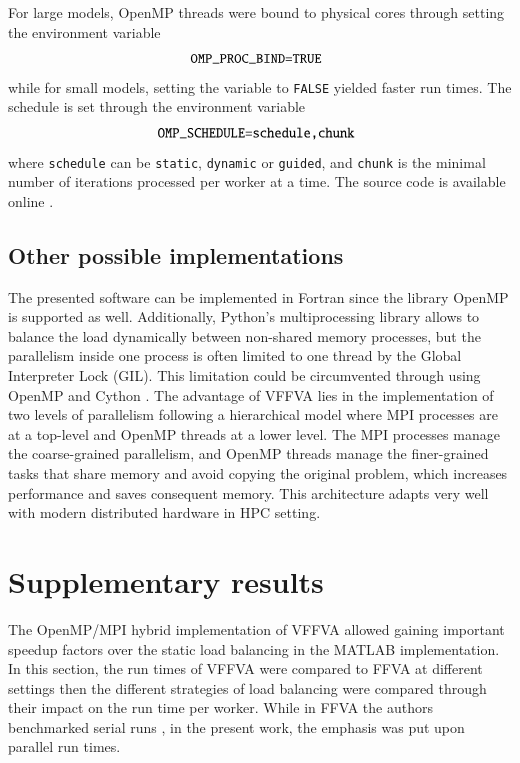 \documentclass[8pt,a4paper]{book}
\begin{document}
For large models, OpenMP threads were bound to physical cores through setting the environment variable 
\begin{equation*} \label{eq:one}
\begin{array}{ll@{}ll}
\texttt{OMP\_PROC\_BIND=TRUE} &\\
\end{array}
\end{equation*}
while for small models, setting the variable to \texttt{FALSE}  yielded faster run times.
The schedule is set through the environment variable
\begin{equation*} \label{eq:one}
\begin{array}{ll@{}ll}
\texttt{OMP\_SCHEDULE=schedule,chunk} &\\
\end{array}
\end{equation*}
where \texttt{schedule} can be \texttt{static}, \texttt{dynamic} or \texttt{guided}, and \texttt{chunk} is the minimal number of iterations processed per worker at a time. The source code is available online \cite{marouen_2018_1442456}.
\subsection*{Other possible implementations}
The presented software can be implemented in Fortran since the library OpenMP is supported as well.
Additionally, Python's multiprocessing library allows to balance the load dynamically between non-shared memory processes, but the parallelism inside one process is often limited to one thread by the Global Interpreter Lock (GIL). This limitation could be circumvented through using OpenMP and Cython \cite{behnel2011cython}. The advantage of VFFVA lies in the implementation of two levels of parallelism following a hierarchical model where MPI processes are at a top-level and OpenMP threads at a lower level. The MPI processes manage the coarse-grained parallelism, and OpenMP threads manage the finer-grained tasks that share memory and avoid copying the original problem, which increases performance and saves consequent memory. This architecture adapts very well with modern distributed hardware in HPC setting.\\
\section*{Supplementary results}
The OpenMP/MPI hybrid implementation of VFFVA allowed gaining important speedup factors over the static load balancing in the MATLAB implementation. In this section, the run times of VFFVA were compared to FFVA at different settings then the different strategies of load balancing were compared through their impact on the run time per worker. While in FFVA the authors benchmarked serial runs \cite{gudmundsson2010computationally}, in the present work, the emphasis was put upon parallel run times.
\end{document}
